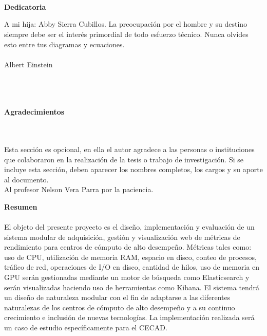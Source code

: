 \newpage{\pagestyle{empty}\cleardoublepage}

\newpage
\thispagestyle{empty} \textbf{}\normalsize
\\\\\\%
\textbf{Dedicatoria}\\[4.0cm]

\begin{flushright}
\begin{minipage}{8cm}
    \noindent
        \small
        A mi hija: Abby Sierra Cubillos.
        \newline
        \newline
        La preocupaci\'{o}n por el hombre y su destino siempre debe ser el
        inter\'{e}s primordial de todo esfuerzo t\'{e}cnico. Nunca olvides esto
        entre tus diagramas y ecuaciones.\\\\
        Albert Einstein\\
\end{minipage}
\end{flushright}

\newpage{\pagestyle{empty}\cleardoublepage}

\newpage
\thispagestyle{empty} \textbf{}\normalsize
\\\\\\%
\textbf{\LARGE Agradecimientos}
\\\\
Esta secci\'{o}n es opcional, en ella el autor agradece a las personas o instituciones que colaboraron en la realizaci\'{o}n de la tesis  o trabajo de investigaci\'{o}n. Si se incluye esta secci\'{o}n, deben aparecer los nombres completos, los cargos y su aporte al documento.\\
Al profesor Nelson Vera Parra por la paciencia.
\\

\newpage{\pagestyle{empty}\cleardoublepage}

\newpage
\textbf{\LARGE Resumen}
\\\\
El objeto del presente proyecto es el diseño, implementación y evaluación de un sistema modular de adquisición, gestión y visualización web de métricas de rendimiento para centros de cómputo de alto desempeño. Métricas tales como: uso de CPU, utilización de memoria RAM, espacio en disco, conteo de procesos, tráfico de red, operaciones de I/O en disco, cantidad de hilos, uso de memoria en GPU serán gestionadas mediante un motor de búsqueda como Elasticsearch y serán visualizadas haciendo uso de herramientas como Kibana. El sistema  tendrá un diseño de naturaleza modular con el fin de adaptarse a las diferentes naturalezas de los centros de cómputo de alto desempeño y a su continuo crecimiento e inclusión de nuevas tecnologías. La implementación realizada será un caso de estudio específicamente para el CECAD.

